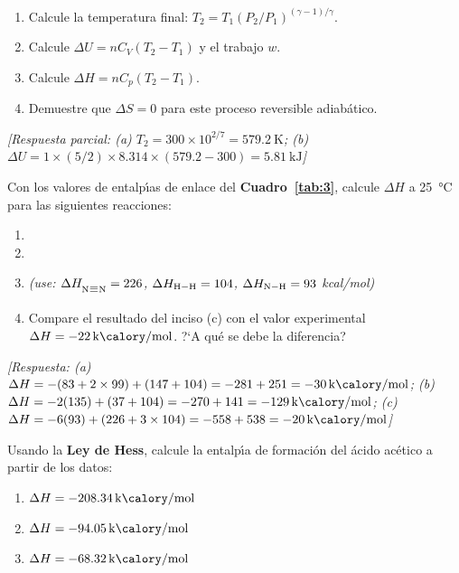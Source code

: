 \begin{bloque_ejercicios}
\begin{ejercicios}
\begin{enumerate}[label=\alph*)]
    \item Calcule la temperatura final:
          $T_2 = T_1(P_2/P_1)^{(\gamma-1)/\gamma}$.
    \item Calcule $\Delta U = nC_V(T_2-T_1)$ y el trabajo $w$.
    \item Calcule $\Delta H = nC_p(T_2-T_1)$.
    \item Demuestre que $\Delta S = 0$ para este proceso
          reversible adiab\'atico.
\end{enumerate}

\textit{[Respuesta parcial:
(a) $T_2 = 300\times10^{2/7} = \SI{579.2}{\kelvin}$;
(b) $\Delta U = 1\times(5/2)\times8.314\times(579.2-300)
= \SI{+5.81}{\kilo\joule}$]}

\item Con los valores de entalp\'{\i}as de enlace del
\textbf{Cuadro~\ref{tab:3}}, calcule $\Delta H$
a \SI{25}{\celsius} para las siguientes reacciones:

\begin{enumerate}[label=\alph*)]
    \item {}
    \item {}
    \item {}
          \textit{(use: $\Delta H_{\ce{N\bond{#}N}} = 226$,
          $\Delta H_{\ce{H-H}} = 104$,
          $\Delta H_{\ce{N-H}} = 93$ kcal/mol)}
    \item Compare el resultado del inciso (c) con el valor
          experimental $\Delta H = \SI{-22}{\kilo\calory\per\mole}$.
          ?`A qu\'e se debe la diferencia?
\end{enumerate}

\textit{[Respuesta:
(a) $\Delta H = -(83+2\times99)+(147+104)
= -281+251 = \SI{-30}{\kilo\calory\per\mole}$;
(b) $\Delta H = -2(135)+(37+104)
= -270+141 = \SI{-129}{\kilo\calory\per\mole}$;
(c) $\Delta H = -6(93)+(226+3\times104)
= -558+538 = \SI{-20}{\kilo\calory\per\mole}$]}

\item Usando la \textbf{Ley de Hess}, calcule la entalp\'{\i}a
de formaci\'on del \'acido ac\'etico
 a partir de los datos:

\begin{enumerate}[label=(\alph*)]
    \item[\textbf{(i)}] 
          \hfill $\Delta H = \SI{-208.34}{\kilo\calory\per\mole}$
    \item[\textbf{(ii)}] 
          \hfill $\Delta H = \SI{-94.05}{\kilo\calory\per\mole}$
    \item[\textbf{(iii)}] 
          \hfill $\Delta H = \SI{-68.32}{\kilo\calory\per\mole}$
\end{enumerate}


\end{ejercicios}
\end{bloque_ejercicios}
